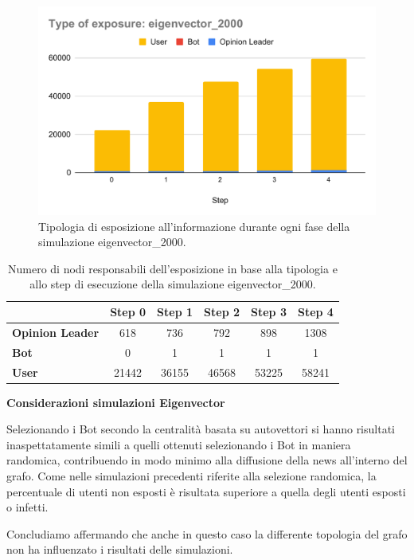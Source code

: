         \begin{figure}[H]
            \centering
            \includegraphics[width=.7\textwidth]{resources/charts/Type of exposure_ eigenvector_2000.pdf}
            \caption{Tipologia di esposizione all'informazione durante ogni fase della simulazione eigenvector\_2000.}
        \end{figure}
        
        \begin{table}[H]
            \centering
            \begin{tabular}{l|c|c|c|c|c}
                           & Step 0 & Step 1 & Step 2 & Step 3 & Step 4 \\ \hline
            \textbf{Opinion Leader} & 618    & 736    & 792    & 898    & 1308   \\ \hline
            \textbf{Bot}            & 0      & 1      & 1      & 1      & 1      \\ \hline
            \textbf{User}           & 21442  & 36155  & 46568  & 53225  & 58241  \\
            \end{tabular}
            \caption{Numero di nodi responsabili dell'esposizione in base alla tipologia e allo step di esecuzione della simulazione eigenvector\_2000.}
        \end{table}

        \textbf{Considerazioni simulazioni Eigenvector}
        
        Selezionando i Bot secondo la centralità basata su autovettori si hanno risultati inaspettatamente simili a quelli ottenuti selezionando i Bot in maniera randomica, contribuendo in modo minimo alla diffusione della news all'interno del grafo. Come nelle simulazioni precedenti riferite alla selezione randomica, la percentuale di utenti non esposti è risultata superiore a  quella degli utenti esposti o infetti.
        
        Concludiamo affermando che anche in questo caso la differente topologia del grafo non ha influenzato i risultati delle simulazioni.